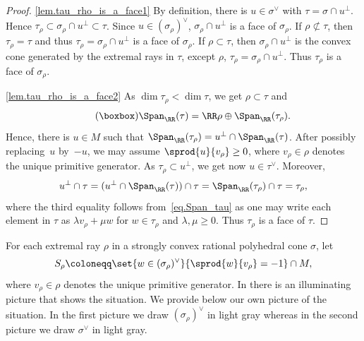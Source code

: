 \skpt
\begin{proof}
\eqref{lem.tau_rho_is_a_face1}
By definition, there is $u \in \sigma^\vee$ with $\tau = \sigma \cap u^\bot$. Hence
$\tau_\rho \subset \sigma_\rho \cap u^\bot \subset \tau$. Since $u \in (\sigma_\rho)^\vee$,
$\sigma_\rho \cap u^\bot$ is a face of $\sigma_\rho$.
If $\rho \not\subset \tau$, then $\tau_\rho = \tau$
and thus $\tau_\rho = \sigma_\rho \cap u^\bot$ is a face of $\sigma_\rho$. If $\rho \subset \tau$,
then $\sigma_\rho \cap u^\bot$ is the convex cone generated by the extremal rays in $\tau$, except $\rho$, \ie $\tau_\rho = \sigma_\rho \cap u^\bot$. Thus $\tau_\rho$ is a face of $\sigma_\rho$.

\eqref{lem.tau_rho_is_a_face2}
As
$\dim \tau_\rho < \dim \tau$, we get $\rho \subset \tau$ and
\[
\label{eq.Span_tau}
\tag{$\boxbox$}
\Span_{\RR}(\tau) = \RR \rho \oplus \Span_{\RR}(\tau_\rho).
\]
Hence, there is $u \in M$ such that $\Span_{\RR}(\tau_\rho) = u^\bot \cap \Span_{\RR}(\tau)$.
After possibly replacing~$u$ by~$-u$, we may assume $\sprod{u}{v_\rho} \geq 0$, where
$v_\rho \in \rho$ denotes the unique primitive generator.
As $\tau_\rho \subset u^\bot$, we get now $u \in \tau^\vee$. Moreover,
\[
u^\bot \cap \tau = (u^\bot \cap \Span_{\RR}(\tau)) \cap \tau = \Span_{\RR}(\tau_\rho) \cap \tau = \tau_\rho,
\]
where the third equality follows from~\eqref{eq.Span_tau} as one may write
each element in $\tau$
as $\lambda v_{\rho} + \mu w$ for $w \in \tau_\rho$ and $\lambda, \mu \geq 0$.
Thus $\tau_\rho$ is a face of $\tau$.
\end{proof}

For each extremal ray $\rho$ in a strongly convex rational polyhedral cone $\sigma$, let
\[
S_{\rho} \coloneqq \set{w \in (\sigma_\rho)^\vee}{\sprod{w}{v_\rho} = -1} \cap M,
\]
where $v_\rho \in \rho$ denotes the unique primitive generator. In \cite[after Def.\,2.3]{Li2010Affine-Bbb-T-varie} there is an illuminating picture that shows the situation.
We provide below our own picture of the situation. In the first picture we draw $(\sigma_\rho)^\vee$
in light gray whereas in the second picture we draw $\sigma^\vee$ in light gray.\vspace*{5pt}


